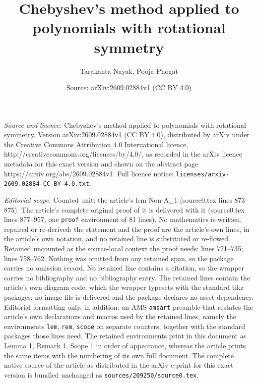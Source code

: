 \documentclass[10pt,a4paper]{amsart}
\title{Chebyshev's method applied to polynomials with rotational symmetry}
\author{Tarakanta Nayak, Pooja Phogat}
\date{Source: arXiv:2609.02884v1 (CC BY 4.0)}
\begin{document}
\maketitle

\noindent\emph{Source and licence.} Chebyshev's method applied to polynomials with rotational symmetry. Version arXiv:2609.02884v1 (CC BY 4.0), distributed by arXiv under the Creative Commons Attribution 4.0 International licence, http://creativecommons.org/licenses/by/4.0/, as recorded in the arXiv licence metadata for this exact version and shown on the abstract page https://arxiv.org/abs/2609.02884v1. Full licence notice: \texttt{licenses/arxiv-2609.02884-CC-BY-4.0.txt}.\par\smallskip

\noindent\textit{Editorial scope.} Counted unit: the article's lem Non-A\_1 (source0.tex lines 873--875). The article's complete original proof of it is delivered with it (source0.tex lines 877--957, one \texttt{proof} environment of 81 lines). No mathematics is written, repaired or re-derived: the statement and the proof are the article's own lines, in the article's own notation, and no retained line is substituted or re-flowed.  Retained uncounted as the source-local context the proof needs: lines 721--735; lines 758--762.  Nothing was omitted from any retained span, so the package carries no omission record.  No retained line contains a citation, so the wrapper carries no bibliography and no bibliography entry.  The retained lines contain the article's own diagram code, which the wrapper typesets with the standard tikz packages; no image file is delivered and the package declares no asset dependency.  Editorial formatting only, in addition: an AMS \texttt{amsart} preamble that restates the article's own declarations and macros used by the retained lines, namely the environments \texttt{lem}, \texttt{rem}, \texttt{scope} on separate counters, together with the standard packages those lines need.  The retained environments print in this document as Lemma 1, Remark 1, Scope 1 in order of appearance, whereas the article prints the same items with the numbering of its own full document.  The complete native source of the article as distributed in the arXiv e-print for this exact version is bundled unchanged as \texttt{sources/209250/source0.tex}.
\end{document}
